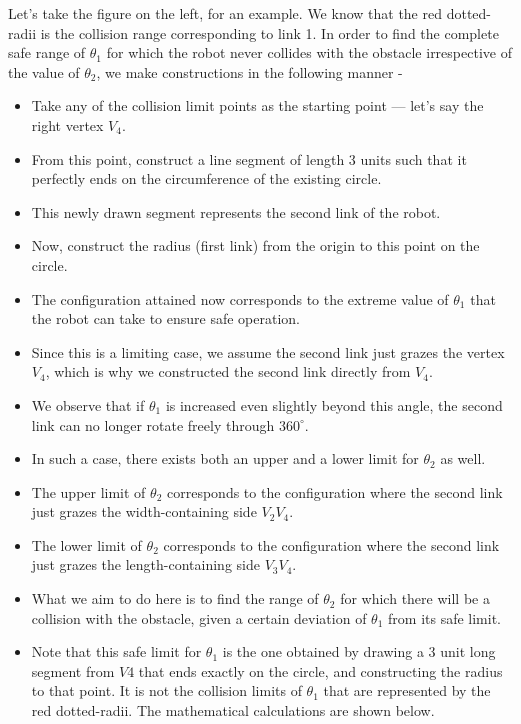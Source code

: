 \documentclass[12pt]{article}
\begin{document}
\newline
\newline
\newline
Let's take the figure on the left, for an example. We know that the red dotted-radii is the collision range corresponding to link 1. In order to find the complete safe range of $\theta_1$ for which the robot never collides with the obstacle irrespective of the value of $\theta_2$, we make constructions in the following manner - 
\newline
\begin{itemize}
  \item Take any of the collision limit points as the starting point — let's say the right vertex \( V_4 \).
  
  \item From this point, construct a line segment of length 3 units such that it perfectly ends on the circumference of the existing circle.
  
  \item This newly drawn segment represents the second link of the robot.
  
  \item Now, construct the radius (first link) from the origin to this point on the circle.
  
  \item The configuration attained now corresponds to the extreme value of \( \theta_1 \) that the robot can take to ensure safe operation.
  
  \item Since this is a limiting case, we assume the second link just grazes the vertex \( V_4 \), which is why we constructed the second link directly from \( V_4 \).
  
  \item We observe that if \( \theta_1 \) is increased even slightly beyond this angle, the second link can no longer rotate freely through \( 360^\circ \).
  
  \item In such a case, there exists both an upper and a lower limit for \( \theta_2 \) as well.
  
  \item The upper limit of \( \theta_2 \) corresponds to the configuration where the second link just grazes the width-containing side \( V_2V_4 \).
  
  \item The lower limit of \( \theta_2 \) corresponds to the configuration where the second link just grazes the length-containing side \( V_3V_4 \).
  
  \item What we aim to do here is to find the range of \( \theta_2 \) for which there will be a collision with the obstacle, given a certain deviation of \( \theta_1 \) from its safe limit.
  
  \item Note that this safe limit for \( \theta_1 \) is the one obtained by drawing a 3 unit long segment from $V4$ that ends exactly on the circle, and constructing the radius to that point. It is not the collision limits of $\theta_1$ that are represented by the red dotted-radii. The mathematical calculations are shown below.
\end{itemize}
\end{document}

